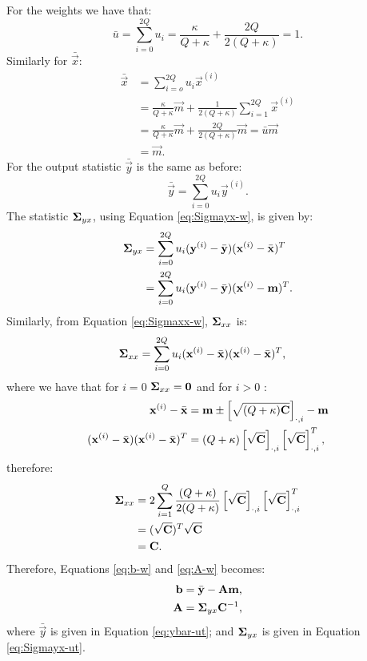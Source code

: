\documentclass[11pt,a4paper]{article}
\newcommand{\x}{\vec{x}}
\newcommand{\y}{\vec{y}}
\renewcommand{\xi}{\x^{(i)}}
\newcommand{\yi}{\y^{(i)}}
\renewcommand{\b}{\vec{b}}
\newcommand{\xbar}{\bar{\x}}
\newcommand{\ybar}{\bar{\y}}
\newcommand{\Sigmaxx}{\mat{\Sigma}_{xx}}
\newcommand{\Sigmayx}{\mat{\Sigma}_{yx}}
\newcommand{\w}{u}
\newcommand{\wi}{u_i}
\newcommand{\wbar}{\bar{\w}}
\newcommand{\m}{\vec{m}}
\renewcommand{\Q}{Q}
\renewcommand{\k}{\kappa}
\newcommand{\mathcol}[2]{  \left[#1\right]_{\cdot, #2} }
\begin{document}
For the weights we have that:
\begin{equation}
	\wbar = \sum_{i=0}^{2\Q} \wi = \frac{\k}{\Q + \k} + \frac{2\Q}{2 (\Q + \k)} = 1 \text{.}
\end{equation}
Similarly for $\xbar$:
\begin{align}
	\xbar &= \sum_{i=o}^{2\Q} \wi \xi \\
	&= \frac{\k}{\Q + \k} \m + \frac{1}{2(\Q + \k)} \sum_{i=1}^{2\Q} \xi \\
	& = \frac{\k}{\Q + \k} \m + \frac{2 \Q}{2 (\Q + \k)} \m  = \wbar \m  \\
	&= \m.
\end{align}
For the output statistic $\ybar$ is the same as before:
\begin{equation}
	\label{eq:ybar-ut}
	\ybar  =  \sum_{i=0}^{2 \Q} \wi \yi \text{.}
\end{equation}
%
The statistic $\Sigmayx$, using Equation 	\eqref{eq:Sigmayx-w}, is given by:
\begin{align}
	\Sigmayx & = \sum_{i=0}^{2\Q} \wi (\yi - \ybar) (\xi - \xbar)^T \\
	\label{eq:Sigmayx-ut}
	& = \sum_{i=0}^{2\Q} \wi (\yi - \ybar) (\xi - \m)^T \text{.}
\end{align}
Similarly, from Equation \eqref{eq:Sigmaxx-w}, $\Sigmaxx$ is:
\begin{align}
\Sigmaxx & = \sum_{i=0}^{2 \Q} \wi (\xi - \xbar) (\xi - \xbar)^T \text{,}
\end{align}
where we have that for $i=0$ $\Sigmaxx = \mat{0}$ and for $i >0$ :
\begin{align}
	\xi - \xbar & = \m \pm   \mathcol{\sqrt{(\Q + \k) \C}}{i} - \m \\
 	(\xi - \xbar) (\xi - \xbar)^T & = (\Q + \k)  \mathcol{\sqrt{\C}}{i}  \mathcol{\sqrt{\C}}{i}^T \text{,}
\end{align}
therefore:
\begin{align}
	\Sigmaxx & = 2 \sum_{i=1}^{\Q}  \frac{(\Q + \k)}{2 (\Q + \k)} \mathcol{\sqrt{\C}}{i}  \mathcol{\sqrt{\C}}{i}^T\\
	&= (\sqrt{\C})^T  \sqrt{\C} \\
	& = \C \text{.}
\end{align}
Therefore, Equations \eqref{eq:b-w} and  \eqref{eq:A-w} becomes:
\begin{align}
	\b &= \ybar - \A \m \text{,} \\
	\A &= \Sigmayx \C^{-1} 
	\text{,}
\end{align}
where $\ybar$ is given in Equation \eqref{eq:ybar-ut}; and 
$\Sigmayx$ is given in Equation  \eqref{eq:Sigmayx-ut}. 
%
\end{document}
